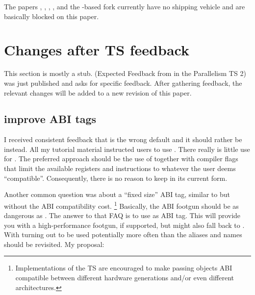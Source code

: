 The papers , , , , and
the -based  fork currently have no shipping vehicle
and are basically blocked on this paper.

\section{Changes after TS feedback}
This section is mostly a stub.
\cite{P1915R0} (Expected Feedback from  in the Parallelism TS 2) was just published and asks for specific feedback.
After gathering feedback, the relevant changes will be added to a new revision of this paper.

\subsection{improve ABI tags}
I received consistent feedback that \simdabi{} is the wrong default and it should rather be \simdabi{} instead.
All my tutorial material instructed users to use \stdx{}.
There really is little use for \simdabi{}.
The preferred approach should be the use of \simdabi{} together with compiler flags that limit the available registers and instructions to whatever the user deems “compatible”.
Consequently, there is no reason to keep \simdabi{} in its current form.

Another common question was about a “fixed size” ABI tag, similar to \stdx\simdabi{} but without the ABI compatibility cost.%
\footnote{Implementations of the TS are encouraged to make passing  objects ABI compatible between different hardware generations and/or even different architectures.}
Basically, the ABI footgun should be as dangerous as \stdx\simdabi{}.
The answer to that FAQ is to use \stdx\simdabi{} as ABI tag.
This will provide you with a high-performance footgun, if supported, but might also fall back to \stdx\simdabi{}.
With \stdx\simdabi{} turning out to be used potentially more often than \stdx\simdabi{} the aliases and names should be revisited.
My proposal:


